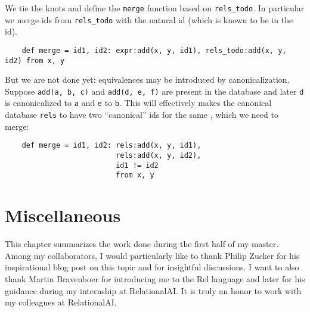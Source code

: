 We tie the knots and define the \verb|merge| function based on \verb|rels_todo|.
In particular we merge ids from \verb|rels_todo| 
 with the natural id (which is known to be in the id).
\begin{verbatim}
    def merge = id1, id2: expr:add(x, y, id1), rels_todo:add(x, y, id2) from x, y
\end{verbatim}

But we are not done yet: equivalences may be introduced by canonicalization.
Suppose \verb|add(a, b, c)| and \verb|add(d, e, f)| are present in the database
 and later \verb|d| is canonicalized to \verb|a| and \verb|e| to \verb|b|.
This will effectively makes the canonical database \verb|rels| to have
 two ``canonical'' ids for the same \enode, which we need to merge:

\begin{verbatim}
    def merge = id1, id2: rels:add(x, y, id1), 
                          rels:add(x, y, id2),
                          id1 != id2 
                          from x, y
\end{verbatim}


\section{Miscellaneous}

This chapter summarizes the work done during the first half of my master.
Among my collaborators,
 I would particularly like to thank Philip Zucker 
 for his inspirational blog post on this topic
 and for insightful discussions.
I want to also thank 
 Martin Bravenboer for introducing me to the Rel language
 and later for his guidance during my internship at RelationalAI.
It is truly an honor to work with my colleagues at RelationalAI.